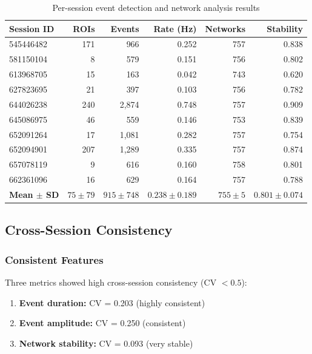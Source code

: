 \documentclass[11pt,twocolumn]{article}
\begin{document}
\begin{table}[t]
\centering
\caption{Per-session event detection and network analysis results}
\label{tab:session_results}
\begin{tabular}{lrrrrr}
\toprule
\textbf{Session ID} & \textbf{ROIs} & \textbf{Events} & \textbf{Rate (Hz)} & \textbf{Networks} & \textbf{Stability} \\
\midrule
545446482 & 171 & 966 & 0.252 & 757 & 0.838 \\
581150104 & 8 & 579 & 0.151 & 756 & 0.802 \\
613968705 & 15 & 163 & 0.042 & 743 & 0.620 \\
627823695 & 21 & 397 & 0.103 & 756 & 0.782 \\
644026238 & 240 & 2,874 & 0.748 & 757 & 0.909 \\
645086975 & 46 & 559 & 0.146 & 753 & 0.839 \\
652091264 & 17 & 1,081 & 0.282 & 757 & 0.754 \\
652094901 & 207 & 1,289 & 0.335 & 757 & 0.874 \\
657078119 & 9 & 616 & 0.160 & 758 & 0.801 \\
662361096 & 16 & 629 & 0.164 & 757 & 0.788 \\
\midrule
\textbf{Mean $\pm$ SD} & $75 \pm 79$ & $915 \pm 748$ & $0.238 \pm 0.189$ & $755 \pm 5$ & $\mathbf{0.801 \pm 0.074}$ \\
\bottomrule
\end{tabular}
\end{table}

\subsection{Cross-Session Consistency}

\subsubsection{Consistent Features}
Three metrics showed high cross-session consistency (CV $< 0.5$):

\begin{enumerate}
    \item \textbf{Event duration:} CV = 0.203 (highly consistent)
    \item \textbf{Event amplitude:} CV = 0.250 (consistent)
    \item \textbf{Network stability:} CV = 0.093 (very stable)
\end{enumerate}
\end{document}
